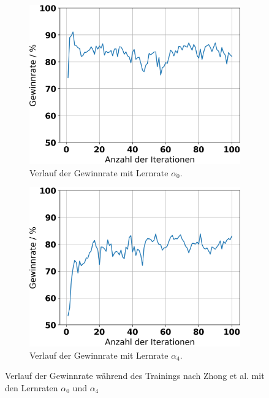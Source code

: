 \begin{figure}[ht!]%
	\begin{subfigure}[b]{0.48\textwidth}
		\includegraphics[width=\textwidth]{Bilder/ensemble-training/a_0_001/graph_win_rates.png}
		\caption{Verlauf der Gewinnrate mit Lernrate $\alpha_0$.}
		\label{fig:f9}
	\end{subfigure}
	\hfill
	\begin{subfigure}[b]{0.48\textwidth}
		\includegraphics[width=\textwidth]{Bilder/ensemble-training/e_0_00001/graph_win_rates.png}
		\caption{Verlauf der Gewinnrate mit Lernrate $\alpha_4$.}
		\label{fig:f10}
	\end{subfigure}
	\caption{Verlauf der Gewinnrate während des Trainings nach Zhong et al. mit den Lernraten $\alpha_0$ und $\alpha_4$}
\end{figure}

